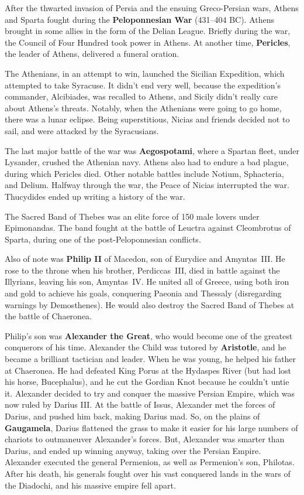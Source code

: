 After the thwarted invasion of Persia and the ensuing Greco-Persian wars,
Athens and Sparta fought during the \textbf{Peloponnesian War} (431--404 BC).
Athens brought in some allies in the form of the Delian League.
Briefly during the war, the Council of Four Hundred took power in Athens.
At another time, \textbf{Pericles}, the leader of Athens, delivered a funeral oration.

The Athenians, in an attempt to win, launched the Sicilian Expedition, which attempted to take Syracuse.
It didn't end very well, because the expedition's commander, Alcibiades, was recalled to Athens,
and Sicily didn't really care about Athens's threats.
Notably, when the Athenians were going to go home, there was a lunar eclipse.
Being superstitious, Nicias and friends decided not to sail, and were attacked by the Syracusians.

The last major battle of the war was \textbf{Aegospotami}, where a Spartan fleet,
under Lysander, crushed the Athenian navy.
Athens also had to endure a bad plague, during which Pericles died.
Other notable battles include Notium, Sphacteria, and Delium.
Halfway through the war, the Peace of Nicias interrupted the war.
Thucydides ended up writing a history of the war.

The Sacred Band of Thebes was an elite force of 150 male lovers under Epimonandas.
The band fought at the battle of Leuctra against Cleombrotus of Sparta, during one of the post-Peloponnesian conflicts.

Also of note was \textbf{Philip II} of Macedon, son of Eurydice and Amyntas~III\@.
He rose to the throne when his brother, Perdiccas~III,
died in battle against the Illyrians, leaving his son, Amyntas~IV\@.
He united all of Greece, using both iron and gold to achieve his goals,
conquering Paeonia and Thessaly (disregarding warnings by Demosthenes).
He would also destroy the Sacred Band of Thebes at the battle of Chaeronea.

Philip's son was \textbf{Alexander the Great}, who would become one of the greatest conquerors of his time.
Alexander the Child was tutored by \textbf{Aristotle}, and he became a brilliant tactician and leader.
When he was young, he helped his father at Chaeronea.
He had defeated King Porus at the Hydaspes River (but had lost his horse, Bucephalus),
and he cut the Gordian Knot because he couldn't untie it.
Alexander decided to try and conquer the massive Persian Empire, which was now ruled by Darius III\@.
At the battle of Issus, Alexander met the forces of Darius, and pushed him back, making Darius mad.
So, on the plains of \textbf{Gaugamela}, Darius flattened the grass to make it easier for his
large numbers of chariots to outmaneuver Alexander's forces.
But, Alexander was smarter than Darius, and ended up winning anyway, taking over the Persian Empire.
Alexander executed the general Permenion, as well as Permenion's son, Philotas.
After his death, his generals fought over his vast conquered lands in the wars of the Diadochi,
and his massive empire fell apart.

